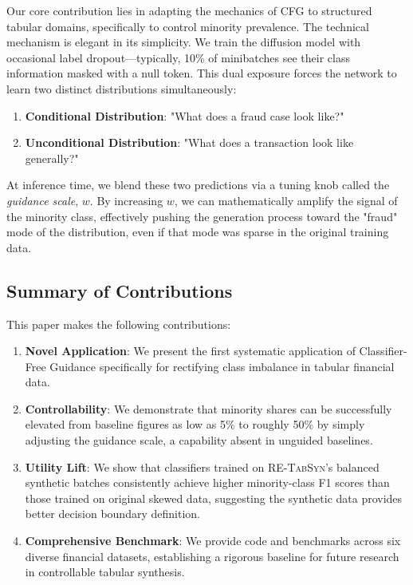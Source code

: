\documentclass[conference]{IEEEtran}
\newcommand{\retabsyn}{\textsc{RE-TabSyn}}
\begin{document}
Our core contribution lies in adapting the mechanics of CFG to structured tabular domains, specifically to control minority prevalence. The technical mechanism is elegant in its simplicity. We train the diffusion model with occasional label dropout—typically, 10\% of minibatches see their class information masked with a null token. This dual exposure forces the network to learn two distinct distributions simultaneously:
\begin{enumerate}
    \item \textbf{Conditional Distribution}: "What does a fraud case look like?"
    \item \textbf{Unconditional Distribution}: "What does a transaction look like generally?"
\end{enumerate}

At inference time, we blend these two predictions via a tuning knob called the \textit{guidance scale}, $w$. By increasing $w$, we can mathematically amplify the signal of the minority class, effectively pushing the generation process toward the "fraud" mode of the distribution, even if that mode was sparse in the original training data.

\subsection{Summary of Contributions}
This paper makes the following contributions:
\begin{enumerate}
    \item \textbf{Novel Application}: We present the first systematic application of Classifier-Free Guidance specifically for rectifying class imbalance in tabular financial data.
    \item \textbf{Controllability}: We demonstrate that minority shares can be successfully elevated from baseline figures as low as 5\% to roughly 50\% by simply adjusting the guidance scale, a capability absent in unguided baselines.
    \item \textbf{Utility Lift}: We show that classifiers trained on \retabsyn{}'s balanced synthetic batches consistently achieve higher minority-class F1 scores than those trained on original skewed data, suggesting the synthetic data provides better decision boundary definition.
    \item \textbf{Comprehensive Benchmark}: We provide code and benchmarks across six diverse financial datasets, establishing a rigorous baseline for future research in controllable tabular synthesis.
\end{enumerate}
\end{document}
